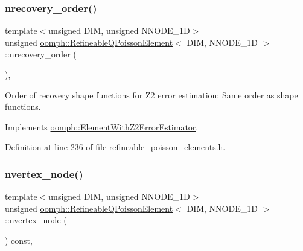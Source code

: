 \subsubsection{\texorpdfstring{nrecovery\+\_\+order()}{nrecovery\_order()}}
{\footnotesize\ttfamily template$<$unsigned D\+IM, unsigned N\+N\+O\+D\+E\+\_\+1D$>$ \\
unsigned \hyperlink{classoomph_1_1RefineableQPoissonElement}{oomph\+::\+Refineable\+Q\+Poisson\+Element}$<$ D\+IM, N\+N\+O\+D\+E\+\_\+1D $>$\+::nrecovery\+\_\+order (\begin{DoxyParamCaption}{ }\end{DoxyParamCaption})\hspace{0.3cm}{\ttfamily [inline]}, {\ttfamily [virtual]}}



Order of recovery shape functions for Z2 error estimation\+: Same order as shape functions. 



Implements \hyperlink{classoomph_1_1ElementWithZ2ErrorEstimator_af39480835bd3e0f6b2f4f7a9a4044798}{oomph\+::\+Element\+With\+Z2\+Error\+Estimator}.



Definition at line 236 of file refineable\+\_\+poisson\+\_\+elements.\+h.

\mbox{\label{classoomph_1_1RefineableQPoissonElement_aa0459e0394b99cdba6b70780dc33688e}} 
\subsubsection{\texorpdfstring{nvertex\+\_\+node()}{nvertex\_node()}}
{\footnotesize\ttfamily template$<$unsigned D\+IM, unsigned N\+N\+O\+D\+E\+\_\+1D$>$ \\
unsigned \hyperlink{classoomph_1_1RefineableQPoissonElement}{oomph\+::\+Refineable\+Q\+Poisson\+Element}$<$ D\+IM, N\+N\+O\+D\+E\+\_\+1D $>$\+::nvertex\+\_\+node (\begin{DoxyParamCaption}{ }\end{DoxyParamCaption}) const\hspace{0.3cm}{\ttfamily [inline]}, {\ttfamily [virtual]}}



